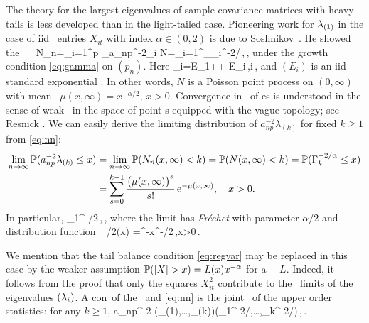 The theory for the largest eigenvalues of sample covariance matrices with heavy tails is less developed than in the light-tailed case.
Pioneering work for $\lambda_{(1)}$ in the case of iid \regvary\ entries $X_{it}$ with index $\alpha\in (0,2)$
is due to Soshnikov~\cite{soshnikov:2004,soshnikov:2006}. He showed the \pp\ \con\
\beam\label{eq:nn}
N_n=\sum_{i=1}^p \vep_{a_{np}^{-2}\la_i} \std N=\sum_{i=1}^\infty \vep_{\Gamma_i^{-2/\alpha}}\,,\qquad \nto\,,
\eeam
under the growth condition \eqref{eq:gamma} on $(p_n)$.
Here
\beam\label{eq:Gamma}
\Gamma_i=E_1+\cdots + E_i\,,\qquad i\,,
\eeam
and $(E_i)$ is an iid standard exponential \seq . In other words, $N$ is a Poisson point process on $(0,\infty)$ with mean \ms\
$\mu(x,\infty)= x^{-\alpha/2}$, $x>0$. Convergence in \ds\ of \pp es is understood in the sense of weak \con\
in the space of point \ms s equipped with the vague topology; see Resnick \cite{resnick:2007,resnick:1987}.
We can easily derive the limiting distribution of $a_{np}^{-2} \lambda_{(k)}$ for fixed $k\ge 1$ from \eqref{eq:nn}:
\begin{equation*}
\begin{split}
\lim_{n \to \infty}\mathbb{P}(a_{np}^{-2} \lambda_{(k)}\le x)&= \lim_{n \to \infty}\mathbb{P}(N_n(x,\infty)<k)
=  \mathbb{P}(N(x,\infty)<k) =\mathbb{P}(\Gamma_k^{-2/\alpha}\le x)\\ &= \sum_{s=0}^{k-1} \frac{\big(\mu(x,\infty)\big)^s}{s!} \operatorname{e}^{-\mu(x,\infty)}, \quad  x>0.
\end{split}
\end{equation*}
In particular,
\beao
{}\std \Gamma_1^{-\alpha/2}\,,\qquad \nto\,,
\eeao
where the limit has {\em Fr\'echet \ds } with parameter $\alpha/2$ and distribution function
\beao
\Phi_{\alpha/2}(x) =\ex^{-x^{-\alpha/2}}\,,\qquad x>0\,.
\eeao

\noindent We mention that the tail balance condition \eqref{eq:regvar} may be replaced in this case by the weaker assumption
$\P(|X|>x)= L(x) x^{-\alpha}$ for a \slvary\ \fct\ $L$. Indeed, it follows from the proof %
that only the squares $X_{it}^2$ contribute to the \pp\ limits of the eigenvalues $(\lambda_i)$. A con\seq\ of the
\cmt\ and \eqref{eq:nn} is the joint \con\ of the upper order statistics: for any $k\ge 1$,
\beao
a_{np}^{-2} \big(\la_{(1)},\ldots,\la_{(k)}\big)\std \big(\Gamma_1^{-2/\alpha},\ldots,\Gamma_k^{-2/\alpha}\big)\,,\qquad \nto\,.
\eeao

